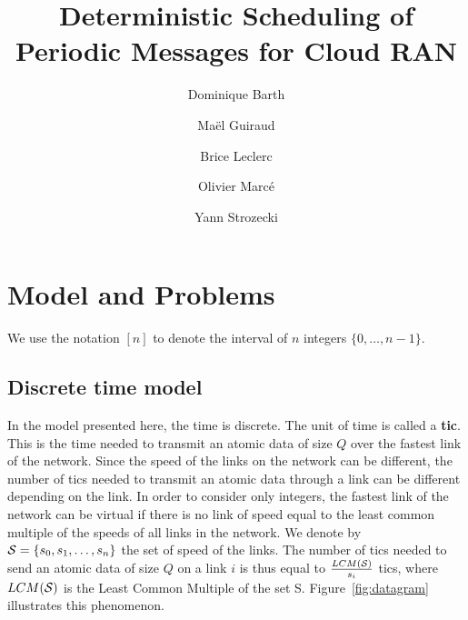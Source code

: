 \documentclass[10pt]{article}
\title{Deterministic Scheduling of Periodic Messages for Cloud RAN}
\author[1]{Dominique Barth}
\author[1,2]{Ma\"el Guiraud}
\author[2]{Brice Leclerc}
\author[2]{Olivier Marc\'e}
\author[1]{Yann Strozecki}
\affil[1]{David Laboratory, UVSQ}
\affil[2]{Nokia Bell Labs France}
\begin{document}
\maketitle\section{Model and Problems}\label{sec:def}

We use the notation $[n]$ to denote the interval of $n$ integers $\{0,\dots,n-1\}$.

  \subsection{Discrete time model}
  In the model presented here, the time is discrete. The unit of time  is called a {\bf tic}. This is the time needed to transmit an atomic data of size $Q$ over the fastest link of the network. Since the speed of the links on the network can be different, the number of tics needed to transmit an atomic data through a link can be different depending on the link. In order to consider only integers, the fastest link of the network can be virtual if there is no link of speed equal to the least common multiple of the speeds of all links in the network. We denote by ${\cal S} = \{s_0,s_1,\ldots,s_n\}$ the set of speed of the links. The number of tics needed to send an atomic data of size $Q$ on a link $i$ is thus equal to $\frac{LCM({\cal S})}{s_i}$ tics, where $LCM({\cal S})$ is the Least Common Multiple of the set {\cal S}. Figure~\ref{fig:datagram} illustrates this phenomenon.
  
\end{document}
